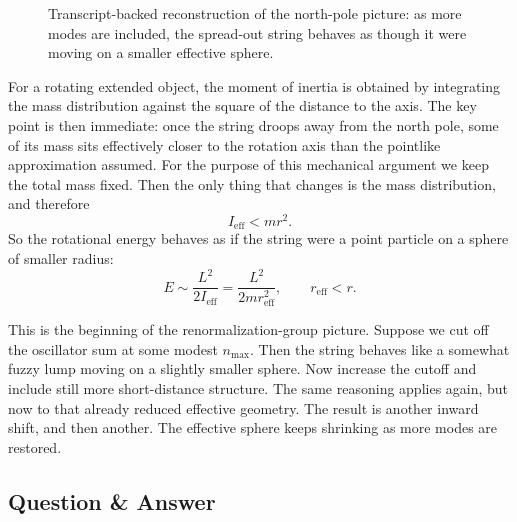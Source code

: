 \begin{figure}[h]
\centering
{}
\caption{Transcript-backed reconstruction of the north-pole picture: as more modes are included, the spread-out string behaves as though it were moving on a smaller effective sphere.}
\end{figure}

For a rotating extended object, the moment of inertia is obtained by integrating the mass distribution against the square of the distance to the axis. The key point is then immediate: once the string droops away from the north pole, some of its mass sits effectively closer to the rotation axis than the pointlike approximation assumed. For the purpose of this mechanical argument we keep the total mass fixed. Then the only thing that changes is the mass distribution, and therefore
\begin{equation}
I_{\mathrm{eff}}<mr^2.
\end{equation}
So the rotational energy behaves as if the string were a point particle on a sphere of smaller radius:
\begin{equation}
E\sim \frac{L^2}{2I_{\mathrm{eff}}}
=
\frac{L^2}{2m r_{\mathrm{eff}}^2},
\qquad
r_{\mathrm{eff}}<r.
\end{equation}

This is the beginning of the renormalization-group picture. Suppose we cut off the oscillator sum at some modest \(n_{\max}\). Then the string behaves like a somewhat fuzzy lump moving on a slightly smaller sphere. Now increase the cutoff and include still more short-distance structure. The same reasoning applies again, but now to that already reduced effective geometry. The result is another inward shift, and then another. The effective sphere keeps shrinking as more modes are restored.

\subsection{Question \& Answer}

